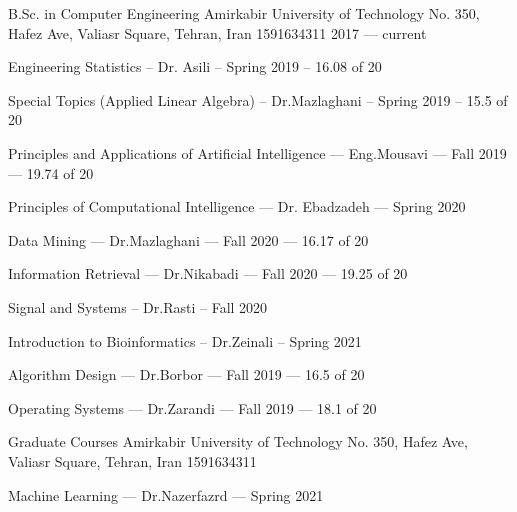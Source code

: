 

\begin{cventries}

  \cventry
    {B.Sc. in Computer Engineering} %
    {Amirkabir University of Technology} %
    {No. 350, Hafez Ave, Valiasr Square, Tehran, Iran 1591634311} %
    {2017 --- current} %
    {
        \begin{cvitems}
            \item Engineering Statistics -- Dr. Asili -- Spring 2019 -- 16.08 of 20
            \item Special Topics (Applied Linear Algebra) -- Dr.Mazlaghani -- Spring 2019 -- 15.5 of 20
            \item Principles and Applications of Artificial Intelligence --- Eng.Mousavi --- Fall 2019 --- 19.74 of 20
            \item Principles of Computational Intelligence --- Dr. Ebadzadeh --- Spring 2020
            \item Data Mining --- Dr.Mazlaghani --- Fall 2020 --- 16.17 of 20
            \item Information Retrieval --- Dr.Nikabadi --- Fall 2020 --- 19.25 of 20
            \item Signal and Systems -- Dr.Rasti -- Fall 2020
            \item Introduction to Bioinformatics -- Dr.Zeinali -- Spring 2021
            \item Algorithm Design --- Dr.Borbor --- Fall 2019 --- 16.5 of 20
            \item Operating Systems --- Dr.Zarandi --- Fall 2019 --- 18.1 of 20
        \end{cvitems}
    }

    \cventry
    {Graduate Courses} %
    {Amirkabir University of Technology} %
    {No. 350, Hafez Ave, Valiasr Square, Tehran, Iran 1591634311} %
    {} %
    {
        \begin{cvitems}
            \item Machine Learning --- Dr.Nazerfazrd --- Spring 2021
        \end{cvitems}
    }

\end{cventries}
